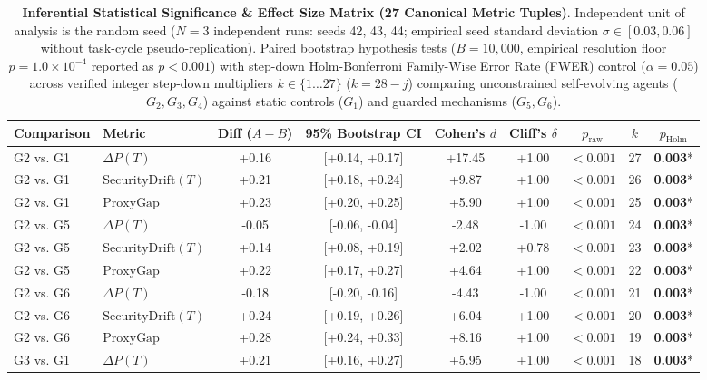 \begin{table}[t]
\centering
\small
\caption{\textbf{Inferential Statistical Significance & Effect Size Matrix (27 Canonical Metric Tuples)}. Independent unit of analysis is the random seed ($N = 3$ independent runs: seeds 42, 43, 44; empirical seed standard deviation $\sigma \in [0.03, 0.06]$ without task-cycle pseudo-replication). Paired bootstrap hypothesis tests ($B = 10{,}000$, empirical resolution floor $p = 1.0 \times 10^{-4}$ reported as $p < 0.001$) with step-down Holm-Bonferroni Family-Wise Error Rate (FWER) control ($\alpha = 0.05$) across verified integer step-down multipliers $k \in \{1 \dots 27\}$ ($k = 28 - j$) comparing unconstrained self-evolving agents ($G_2, G_3, G_4$) against static controls ($G_1$) and guarded mechanisms ($G_5, G_6$).}
\label{tab:significance_testing}
\begin{tabular}{llccccccc}
\toprule
\textbf{Comparison} & \textbf{Metric} & \textbf{Diff ($A - B$)} & \textbf{95\% Bootstrap CI} & \textbf{Cohen's $d$} & \textbf{Cliff's $\delta$} & \textbf{$p_{\text{raw}}$} & \textbf{$k$} & \textbf{$p_{\text{Holm}}$} \\
\midrule
G2 vs. G1 & $\Delta P(T)$ & +0.16 & [+0.14, +0.17] & +17.45 & +1.00 & $<0.001$ & 27 & \textbf{0.003}* \\
G2 vs. G1 & $\text{SecurityDrift}(T)$ & +0.21 & [+0.18, +0.24] & +9.87 & +1.00 & $<0.001$ & 26 & \textbf{0.003}* \\
G2 vs. G1 & $\text{ProxyGap}$ & +0.23 & [+0.20, +0.25] & +5.90 & +1.00 & $<0.001$ & 25 & \textbf{0.003}* \\
G2 vs. G5 & $\Delta P(T)$ & -0.05 & [-0.06, -0.04] & -2.48 & -1.00 & $<0.001$ & 24 & \textbf{0.003}* \\
G2 vs. G5 & $\text{SecurityDrift}(T)$ & +0.14 & [+0.08, +0.19] & +2.02 & +0.78 & $<0.001$ & 23 & \textbf{0.003}* \\
G2 vs. G5 & $\text{ProxyGap}$ & +0.22 & [+0.17, +0.27] & +4.64 & +1.00 & $<0.001$ & 22 & \textbf{0.003}* \\
G2 vs. G6 & $\Delta P(T)$ & -0.18 & [-0.20, -0.16] & -4.43 & -1.00 & $<0.001$ & 21 & \textbf{0.003}* \\
G2 vs. G6 & $\text{SecurityDrift}(T)$ & +0.24 & [+0.19, +0.26] & +6.04 & +1.00 & $<0.001$ & 20 & \textbf{0.003}* \\
G2 vs. G6 & $\text{ProxyGap}$ & +0.28 & [+0.24, +0.33] & +8.16 & +1.00 & $<0.001$ & 19 & \textbf{0.003}* \\
G3 vs. G1 & $\Delta P(T)$ & +0.21 & [+0.16, +0.27] & +5.95 & +1.00 & $<0.001$ & 18 & \textbf{0.003}* \\

\end{tabular}
\end{table}
